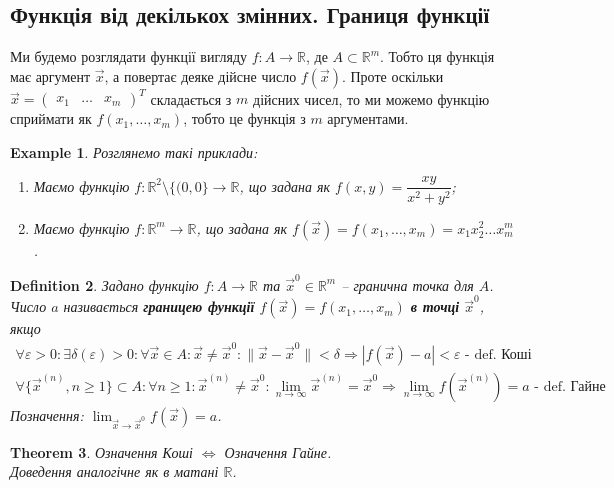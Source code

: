 \documentclass[a4paper, 10pt]{article}
\def\huge{\displaystyle}
\theoremstyle{theoremdd}
\newtheorem{theorem}{Theorem}[subsection]
\theoremstyle{theoremdd}
\theoremstyle{theoremdd}
\newtheorem{definition}[theorem]{Definition}
\theoremstyle{theoremdd}
\theoremstyle{theoremdd}
\newtheorem{example}[theorem]{Example}
\theoremstyle{theoremdd}
\theoremstyle{theoremdd}
\theoremstyle{theoremdd}
\theoremstyle{theoremdd}
\newcommand\Norm[1]{\|#1\|}
\begin{document}
\subsection{Функція від декількох змінних. Границя функції}
Ми будемо розглядати функції вигляду $f \colon A \to \mathbb{R}$, де $A \subset \mathbb{R}^m$. Тобто ця функція має аргумент $\vec{x}$, а повертає деяке дійсне число $f(\vec{x})$. Проте оскільки $\vec{x} = \begin{pmatrix}
x_1 & \dots & x_m
\end{pmatrix}^T$ складається з $m$ дійсних чисел, то ми можемо функцію сприймати як $f(x_1,\dots,x_m)$, тобто це функція з $m$ аргументами.

\begin{example} Розглянемо такі приклади:
\begin{enumerate}[nosep,wide=0pt,label={\arabic*)}]
\item Маємо функцію $f \colon \mathbb{R}^2 \setminus \{(0,0\} \to \mathbb{R}$, що задана як $f(x,y) = \dfrac{xy}{x^2+y^2}$;
\item Маємо функцію $f \colon \mathbb{R}^m \to \mathbb{R}$, що задана як $f(\vec{x}) = f(x_1,\dots,x_m) = x_1 x_2^2 \dots x_m^m$.
\end{enumerate}
\end{example}

\begin{definition}
Задано функцію $f \colon A \to \mathbb{R}$ та $\vec{x}^0 \in \mathbb{R}^m$ -- гранична точка для $A$.\\
Число $a$ називається \textbf{границею функції} $f(\vec{x}) = f(x_1,\dots,x_m)$ \textbf{в точці} $\vec{x}^0$, якщо
\begin{align*}
\forall \varepsilon > 0: \exists \delta(\varepsilon) > 0: \forall \vec{x} \in A: \vec{x} \neq \vec{x}^0: \Norm{\vec{x} - \vec{x}^0} < \delta \Rightarrow |f(\vec{x}) - a| < \varepsilon \textrm{ - def. Коші}\\
\forall \{\vec{x}^{(n)}, n \geq 1\} \subset A: \forall n \geq 1: \vec{x}^{(n)} \neq \vec{x}^0: \huge \lim_{n \to \infty} \vec{x}^{(n)} = \vec{x}^0 \Rightarrow \lim_{n \to \infty} f(\vec{x}^{(n)}) = a \textrm{ - def. Гайне}
\end{align*}
Позначення: $\huge \lim_{\vec{x} \to \vec{x}^0} f(\vec{x}) = a$.
\end{definition}

\begin{theorem}
Означення Коші $\iff$ Означення Гайне.\\
\textit{Доведення аналогічне як в матані $\mathbb{R}$.}
\end{theorem}
\end{document}
